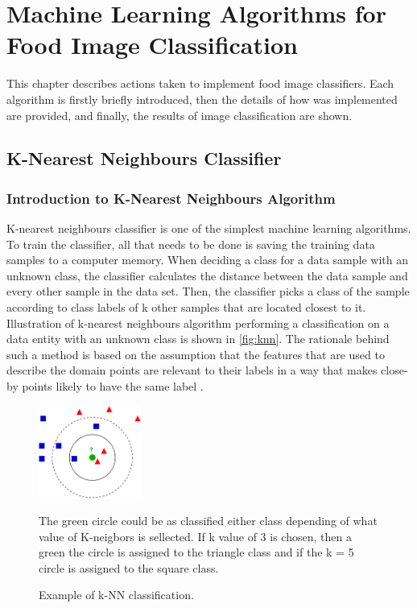 \chapter{Machine Learning Algorithms for Food Image Classification}
This chapter describes actions taken to implement food image classifiers. Each algorithm is firstly briefly introduced, then the details of how was implemented are provided, and finally, the results of image classification are shown.

\section{K-Nearest Neighbours Classifier}

\subsection{Introduction to K-Nearest Neighbours Algorithm}
K-nearest neighbours classifier is one of the simplest machine learning algorithms. To train the classifier, all that needs to be done is saving the training data samples to a computer memory. When deciding a class for a data sample with an unknown class, the classifier calculates the distance between the data sample and every other sample in the data set. Then, the classifier picks a class of the sample according to class labels of k other samples that are located closest to it. Illustration of k-nearest neighbours algorithm performing a classification on a data entity with an unknown class is shown in \autoref{fig:knn}. The rationale behind such a method is based on the assumption that the features that are used to describe the domain points are relevant to their labels in a way that makes close-by points likely to have the same label \citep{Shalev}. 


\begin{figure}[h]
\centering
\includegraphics[width=0.3\textwidth]{Figures/knn.png}
\caption{Example of k-NN classification. \citep{wikipedia_2017}}
\medskip
\small
The green circle could be as classified either class depending of what value of K-neigbors is sellected. If k value of 3 is chosen, then a green the circle is assigned to the triangle class and if the k = 5  circle is assigned to the square class.
\label{fig:knn}
\end{figure}


